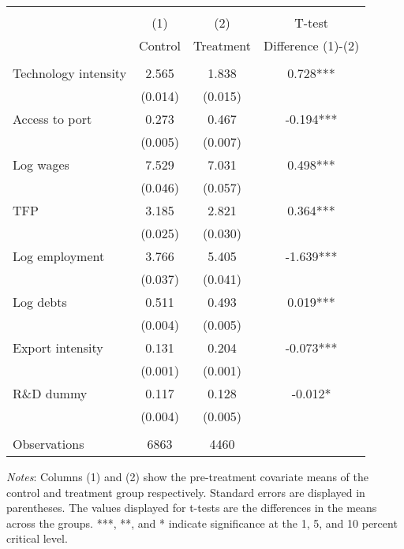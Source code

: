 
\begin{threeparttable}
\begin{tabular}{lccc}
\\[-1.8ex]\toprule \toprule \\[-1.8ex]
 & (1)  & (2)  & T-test  \\
 & Control  & Treatment  & Difference (1)-(2) \\ \midrule \\[-1.8ex] 
Technology intensity & 2.565 &  1.838 	& 0.728***		\\
				& (0.014) 	& (0.015) 	& 				\\
Access to port 	& 0.273 	& 0.467 	&  -0.194***	\\ 
				& (0.005) 	& (0.007)	& 				\\
Log wages		&  7.529 	& 7.031 	& 0.498*** 		\\ 
				& (0.046)	& (0.057) 	&  				\\
TFP 			& 3.185		& 2.821		& 0.364***		\\ 
				& (0.025) 	& (0.030)  	&				\\
Log employment 	& 3.766 	& 5.405 	& -1.639***		\\
				& (0.037) 	& (0.041)  	&				\\
Log debts 		& 0.511 	& 0.493 	& 0.019***		\\ 
				& (0.004) 	& (0.005)	&			   	\\
Export intensity &  0.131 	&  0.204 	& -0.073*** 	\\ 
				& (0.001) 	& (0.001) 	&				\\
R\&D dummy 		& 0.117 	& 0.128 	& -0.012*		\\ 
				& (0.004) 	& (0.005) 	&  				\\ \\[-1.8ex]
Observations 	& 6863 		& 4460 		&				\\
\bottomrule \bottomrule 
\end{tabular} 

\begin{tablenotes}[flushleft]
\footnotesize
\item \textit{Notes}: Columns (1) and (2) show the pre-treatment covariate means of the control and treatment group respectively. Standard errors are displayed in parentheses. The values displayed for t-tests are the differences in the means across the groups. ***, **, and * indicate significance at the 1, 5, and 10 percent critical level.
\end{tablenotes}

\end{threeparttable}

